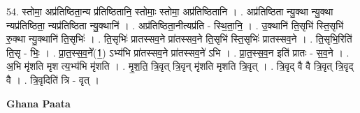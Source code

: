\documentclass[17pt]{extarticle}
\begin{document}
54. स्तोमा॒ अप्र॑तिष्ठिता॒न्य प्र॑तिष्ठितानि॒ स्तोमाः॒ स्तोमा॒ अप्र॑तिष्ठितानि । . अप्र॑तिष्ठिता न्यु॒क्था न्यु॒क्था न्यप्र॑तिष्ठिता॒ न्यप्र॑तिष्ठिता न्यु॒क्थानि॑ । . अप्र॑तिष्ठिता॒नीत्यप्र॑ति - स्थि॒ता॒नि॒ । . उ॒क्थानि॑ ति॒सृभि॑ स्ति॒सृभि॑ रु॒क्था न्यु॒क्थानि॑ ति॒सृभिः॑ । . ति॒सृभिः॑ प्रातस्सव॒ने प्रा॑तस्सव॒ने ति॒सृभि॑ स्ति॒सृभिः॑ प्रातस्सव॒ने । . ति॒सृभि॒रिति॑ ति॒सृ - भिः॒ । . प्रा॒त॒स्स॒व॒ने᳚(1॒) ऽभ्य॑भि प्रा॑तस्सव॒ने प्रा॑तस्सव॒ने॑ ऽभि । . प्रा॒त॒स्स॒व॒न इति॑ प्रातः - स॒व॒ने । . अ॒भि मृ॑शति मृश त्य॒भ्य॑भि मृ॑शति । . मृ॒श॒ति॒ त्रि॒वृत् त्रि॒वृन् मृ॑शति मृशति त्रि॒वृत् । . त्रि॒वृद् वै वै त्रि॒वृत् त्रि॒वृद् वै । . त्रि॒वृदिति॑ त्रि - वृत् । \newline

\textbf{Ghana Paata } \newline
\end{document}

